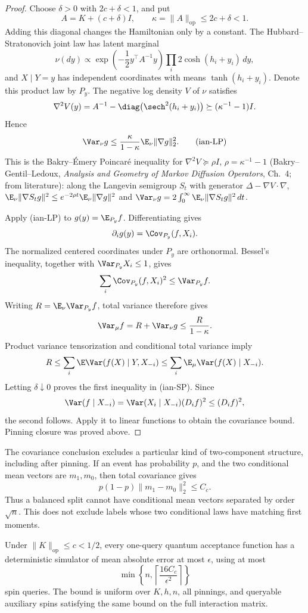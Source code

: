 \begin{proof}
Choose \(\delta>0\) with \(2c+\delta<1\), and put
\[
 A=K+(c+\delta)I,\qquad \kappa=\|A\|_{\mathrm{op}}\le2c+\delta<1.
\]
Adding this diagonal changes the Hamiltonian only by a constant.
The Hubbard--Stratonovich joint law has latent marginal
\[
 \nu(dy)\propto
 \exp\left(-\frac12y^\top A^{-1}y\right)
 \prod_i2\cosh(h_i+y_i)\,dy,
\]
and \(X\mid Y=y\) has independent coordinates with means
\(\tanh(h_i+y_i)\). Denote this product law by \(P_y\).
The negative log density \(V\) of \(\nu\) satisfies
\[
 \nabla^2V(y)
 =A^{-1}-\diag\bigl(\sech^2(h_i+y_i)\bigr)
 \succeq(\kappa^{-1}-1)I.
\]
Hence
\[
 \Var_\nu g\le\frac{\kappa}{1-\kappa}\E_\nu\|\nabla g\|_2^2.
 \tag{ian-LP}
\]
This is the Bakry--\'Emery Poincar\'e inequality for
\(\nabla^2V\succeq\rho I\), \(\rho=\kappa^{-1}-1\) (Bakry--Gentil--Ledoux,
\emph{Analysis and Geometry of Markov Diffusion Operators}, Ch.~4; from
literature): along the Langevin
semigroup \(S_t\) with generator \(\Delta-\nabla V\cdot\nabla\),
\(\E_\nu\|\nabla S_tg\|^2\le e^{-2\rho t}\E_\nu\|\nabla g\|^2\) and
\(\Var_\nu g=2\int_0^\infty\E_\nu\|\nabla S_tg\|^2\,dt\).

Apply (ian-LP) to \(g(y)=\E_{P_y}f\). Differentiating gives
\[
 \partial_i g(y)=\Cov_{P_y}(f,X_i).
\]
The normalized centered coordinates under \(P_y\) are orthonormal.
Bessel's inequality, together with \(\Var_{P_y}X_i\le1\), gives
\[
 \sum_i\Cov_{P_y}(f,X_i)^2
 \le \Var_{P_y}f.
\]
Writing \(R=\E_\nu\Var_{P_y}f\), total variance therefore gives
\[
 \Var_\mu f=R+\Var_\nu g
 \le \frac{R}{1-\kappa}.
\]
Product variance tensorization and conditional total variance imply
\[
 R
 \le\sum_i\E\Var(f(X)\mid Y,X_{-i})
 \le\sum_i\E_\mu\Var(f(X)\mid X_{-i}).
\]
Letting \(\delta\downarrow0\) proves the first inequality in (ian-SP).
Since
\[
 \Var(f\mid X_{-i})
 =\Var(X_i\mid X_{-i})(D_if)^2\le(D_if)^2,
\]
the second follows. Apply it to linear functions to obtain the covariance
bound. Pinning closure was proved above.
\end{proof}

The covariance conclusion excludes a particular kind of two-component
structure, including after pinning. If an event has probability \(p\),
and the two conditional mean vectors are \(m_1,m_0\), then total
covariance gives
\[
 p(1-p)\|m_1-m_0\|_2^2\le C_c.
\]
Thus a balanced split cannot have conditional mean vectors separated
by order \(\sqrt n\). This does not exclude labels whose two conditional
laws have matching first moments.

\begin{theorem}
\label{ian:one-query-spectral}
Under \(\|K\|_{\mathrm{op}}\le c<1/2\), every one-query quantum acceptance
function has a deterministic simulator of mean absolute error at most
\(\epsilon\), using at most
\[
 \min\left\{n,\left\lceil\frac{16C_c}{\epsilon^2}\right\rceil\right\}
\]
spin queries. The bound is uniform over \(K,h,n\), all pinnings, and
queryable auxiliary spins satisfying the same bound on the full
interaction matrix.
\end{theorem}

